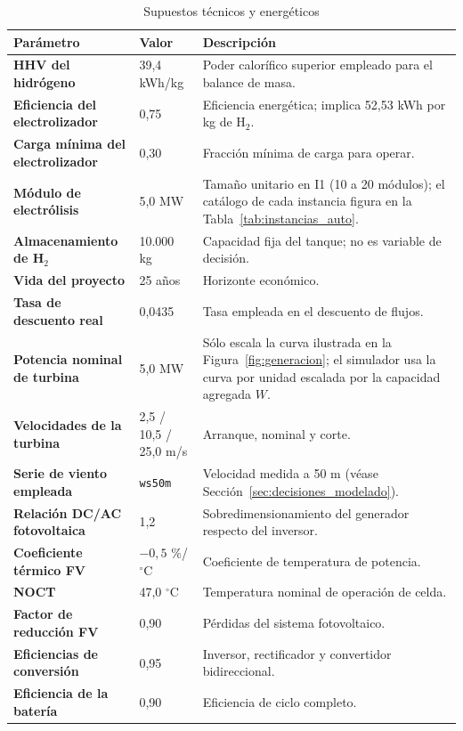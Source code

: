 \begin{table}[H]
\centering
\caption{Supuestos técnicos y energéticos}
\label{tab:parametros_tecnicos_replica}
\begin{tabular}{p{4.2cm} p{3.0cm} p{8.1cm}}
\hline
\textbf{Parámetro} & \textbf{Valor} & \textbf{Descripción} \\
\hline
\textbf{HHV del hidrógeno} & 39,4 kWh/kg & Poder calorífico superior empleado para el balance de masa. \\
\textbf{Eficiencia del electrolizador} & 0,75 & Eficiencia energética; implica 52,53 kWh por kg de H$_2$. \\
\textbf{Carga mínima del electrolizador} & 0,30 & Fracción mínima de carga para operar. \\
\textbf{Módulo de electrólisis} & 5,0 MW & Tamaño unitario en I1 (10 a 20 módulos); el catálogo de cada instancia figura en la Tabla~\ref{tab:instancias_auto}. \\
\textbf{Almacenamiento de H$_2$} & 10.000 kg & Capacidad fija del tanque; no es variable de decisión. \\
\textbf{Vida del proyecto} & 25 años & Horizonte económico. \\
\textbf{Tasa de descuento real} & 0,0435 & Tasa empleada en el descuento de flujos. \\
\textbf{Potencia nominal de turbina} & 5,0 MW & Sólo escala la curva ilustrada en la Figura~\ref{fig:generacion}; el simulador usa la curva por unidad escalada por la capacidad agregada $W$. \\
\textbf{Velocidades de la turbina} & 2,5 / 10,5 / 25,0 m/s & Arranque, nominal y corte. \\
\textbf{Serie de viento empleada} & \texttt{ws50m} & Velocidad medida a 50 m (véase Sección~\ref{sec:decisiones_modelado}). \\
\textbf{Relación DC/AC fotovoltaica} & 1,2 & Sobredimensionamiento del generador respecto del inversor. \\
\textbf{Coeficiente térmico FV} & $-0{,}5$ \%/$^\circ$C & Coeficiente de temperatura de potencia. \\
\textbf{NOCT} & 47,0 $^\circ$C & Temperatura nominal de operación de celda. \\
\textbf{Factor de reducción FV} & 0,90 & Pérdidas del sistema fotovoltaico. \\
\textbf{Eficiencias de conversión} & 0,95 & Inversor, rectificador y convertidor bidireccional. \\
\textbf{Eficiencia de la batería} & 0,90 & Eficiencia de ciclo completo. \\
\hline
\end{tabular}
\end{table}

